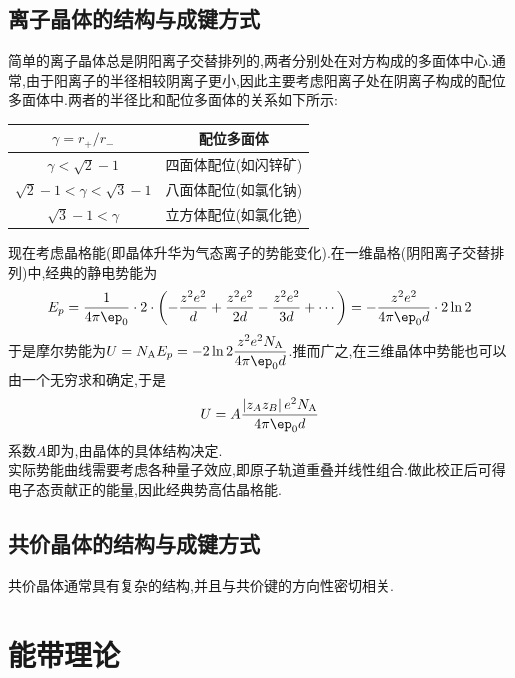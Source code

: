 \documentclass{ctexbook}
\begin{document}
\subsection{离子晶体的结构与成键方式}
简单的离子晶体总是阴阳离子交替排列的,两者分别处在对方构成的多面体中心.通常,由于阳离子的半径相较阴离子更小,因此主要考虑阳离子处在阴离子构成的配位多面体中.两者的半径比和配位多面体的关系如下所示:
\begin{table}[H]\centering
    \begin{tabular}{cc}\hline
        $\gamma=r_+/r_-$ & 配位多面体\\\hline
        $\gamma<\sqrt{2}-1$ & 四面体配位(如闪锌矿)\\
        $\sqrt{2}-1<\gamma<\sqrt{3}-1$ & 八面体配位(如氯化钠)\\
        $\sqrt{3}-1<\gamma$ & 立方体配位(如氯化铯)\\\hline
    \end{tabular}    
\end{table}
现在考虑晶格能(即晶体升华为气态离子的势能变化).在一维晶格(阴阳离子交替排列)中,经典的静电势能为
\[E_p=\dfrac{1}{4\pi\ep_0}\cdot2\cdot\left(-\dfrac{z^2e^2}{d}+\dfrac{z^2e^2}{2d}-\dfrac{z^2e^2}{3d}+\cdots\right)=-\dfrac{z^2e^2}{4\pi\ep_0d}\cdot2\ln2\]
于是摩尔势能为$U=N_{\text{A}}E_p=-2\ln2\dfrac{z^2e^2N_{\text{A}}}{4\pi\ep_0d}$.推而广之,在三维晶体中势能也可以由一个无穷求和确定,于是
\[U=A\dfrac{\left|z_Az_B\right|e^2N_{\text{A}}}{4\pi\ep_0d}\]
系数$A$即为,由晶体的具体结构决定.\\
\indent 实际势能曲线需要考虑各种量子效应,即原子轨道重叠并线性组合.做此校正后可得电子态贡献正的能量,因此经典势高估晶格能.
\subsection{共价晶体的结构与成键方式}
共价晶体通常具有复杂的结构,并且与共价键的方向性密切相关.
\section{能带理论}
\end{document}
